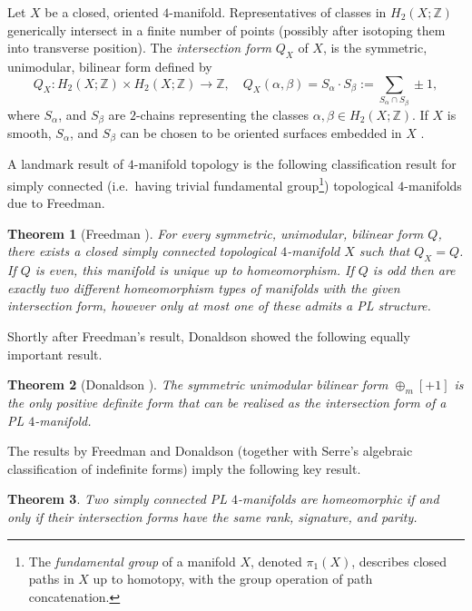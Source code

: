 \documentclass[pdflatex,sn-mathphys-num]{sn-jnl}
\theoremstyle{thmstyleone}%
\newtheorem{theorem}{Theorem}%
\theoremstyle{thmstyletwo}%
\theoremstyle{thmstylethree}%
\newcommand{\bz}{\mathbb{Z}}
\theoremstyle{remark}
\begin{document}
Let $X$ be a closed, oriented $4$-manifold. Representatives of classes in $H_2(X;\bz)$ generically intersect in a finite number of points (possibly after isotoping them into transverse position). The \emph{intersection form} $Q_X$ of $X$, is the symmetric, unimodular, bilinear form defined by
\[
Q_X:H_2(X;\bz)\times H_2(X;\bz)\to\bz,\quad Q_X(\alpha,\beta)=S_\alpha\cdot S_\beta:=\sum_{S_\alpha\cap S_\beta}\pm 1,
\]
where $S_\alpha$, and $S_\beta$ are $2$-chains representing the classes $\alpha,\beta\in H_2(X;\bz)$. If $X$ is smooth, $S_\alpha$, and $S_\beta$ can be chosen to be oriented surfaces embedded in $X$ \cite[Proposition~1.2.3]{GompfStipsicz}. 
    
A landmark result of $4$-manifold topology is the following classification result for simply connected (i.e.\ having trivial fundamental group\footnote{The \emph{fundamental group} of a manifold $X$, denoted $\pi_1(X)$, describes closed paths in $X$ up to homotopy, with the group operation of path concatenation.}) topological $4$-manifolds due to Freedman.
    
\begin{theorem}[Freedman \cite{Freedman-TopOf4Mflds}]\label{thm:freedman}
For every symmetric, unimodular, bilinear form $Q$, there exists a closed simply connected topological $4$-manifold $X$ such that $Q_X=Q$. If $Q$ is even, this manifold is unique up to homeomorphism. If $Q$ is odd then are exactly two different homeomorphism types of manifolds with the given intersection form, however only at most one of these admits a PL structure. 
\end{theorem}

Shortly after Freedman's result, Donaldson showed the following equally important result.

\begin{theorem}[Donaldson \cite{Donaldson}]\label{thm:donaldson}
    The symmetric unimodular bilinear form $\oplus_m[+1]$ is the only positive definite form that can be realised as the intersection form of a PL $4$-manifold.
\end{theorem}

The results by Freedman and Donaldson (together with Serre's algebraic classification of indefinite forms) imply the following key result.

\begin{theorem}\label{thm:simplyConnectedClassification}
    Two simply connected PL $4$-manifolds are homeomorphic if and only if their intersection forms have the same rank, signature, and parity.
\end{theorem}
    
\end{document}

